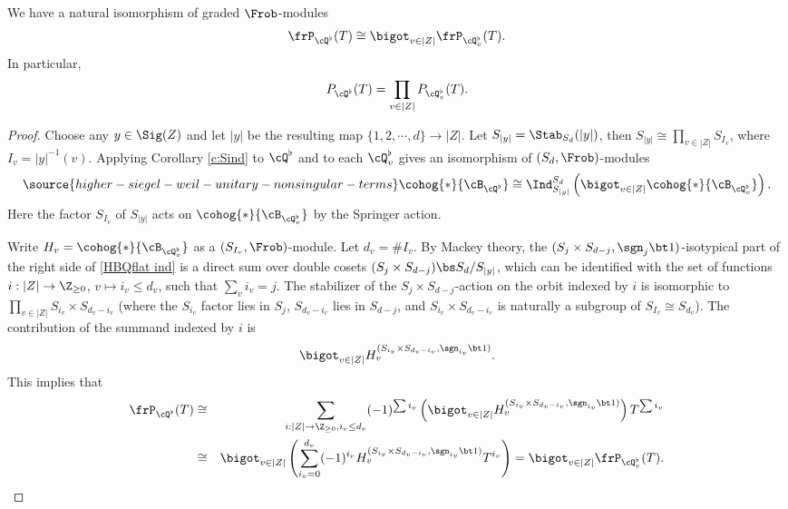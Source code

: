 \begin{lemma}
\notready\label{l:Spr factor}
We have a natural isomorphism of graded $\Frob$-modules
\begin{equation*}
\frP_{\cQ^{\flat}}(T)\cong\bigot_{v\in |Z|}\frP_{\cQ^{\flat}_{v}}(T).
\end{equation*}
In particular,
\begin{equation*}
P_{\cQ^{\flat}}(T)=\prod_{v\in |Z|}P_{\cQ^{\flat}_{v}}(T).
\end{equation*}
\end{lemma}
\begin{proof}
Choose any $y\in \Sig(Z)$ and let $|y|$ be the resulting map $\{1,2,\cdots, d\}\to |Z|$. Let $S_{|y|}=\Stab_{S_{d}}(|y|)$, then $S_{|y|}\cong \prod_{v\in|Z|}S_{I_{v}}$, where $I_{v}=|y|^{-1}(v)$. Applying  Corollary \ref{c:Sind} to $\cQ^{\flat}$ and to each $\cQ^{\flat}_{v}$ gives an isomorphism of $(S_{d},\Frob)$-modules
\begin{equation}\label{HBQflat ind}
\source{higher-siegel-weil-unitary-nonsingular-terms}
\cohog{*}{\cB_{\cQ^{\flat}}}\cong \Ind^{S_{d}}_{S_{|y|}}\left(\bigot_{v\in|Z|}\cohog{*}{\cB_{\cQ^{\flat}_{v}}}\right).
\end{equation}
Here the factor $S_{I_{v}}$ of $S_{|y|}$ acts on $\cohog{*}{\cB_{\cQ^{\flat}_{v}}}$ by the Springer action.

Write $H_{v}=\cohog{*}{\cB_{\cQ^{\flat}_{v}}}$ as a $(S_{I_{v}},\Frob)$-module. Let $d_{v}=\# I_{v}$. By Mackey theory, the $(S_{j}\times S_{d-j}, \sgn_{j}\bt1)$-isotypical part of the right side of \eqref{HBQflat ind} is a direct sum over double cosets $(S_{j}\times S_{d-j})\bs S_{d}/S_{|y|}$, which can be identified with the set of functions $i: |Z|\to \Z_{\ge0}$, $v\mapsto i_{v}\le d_{v}$, such that $\sum_{v}i_{v}=j$. The stabilizer of the $S_{j}\times S_{d-j}$-action on the orbit indexed by $i$ is isomorphic to $\prod_{v\in |Z|}S_{i_{v}}\times S_{d_{v}-i_{v}}$ (where the $S_{i_{v}}$ factor lies in $S_{j}$, $S_{d_{v}-i_{v}}$ lies in $S_{d-j}$, and $S_{i_{v}}\times S_{d_{v}-i_{v}}$ is naturally a subgroup of $S_{I_{v}}\cong S_{d_{v}}$). The contribution of the summand indexed by $i$ is
\begin{equation*}
\bigot_{v\in |Z|}H_{v}^{(S_{i_{v}}\times S_{d_{v}-i_{v}}, \sgn_{i_{v}}\bt 1)}.
\end{equation*}
This implies that
\begin{eqnarray*}
\frP_{\cQ^{\flat}}(T)&\cong &\sum_{i:|Z|\to \Z_{\ge0},  i_{v}\le d_{v}}(-1)^{\sum i_{v}}\left(\bigot_{v\in |Z|} H_{v}^{(S_{i_{v}}\times S_{d_{v}-i_{v}}, \sgn_{i_{v}}\bt 1)}\right)T^{\sum i_{v}}\\
&\cong&\bigot_{v\in |Z|}\left(\sum_{i_{v}=0}^{d_{v}} (-1)^{i_{v}}H_{v}^{(S_{i_{v}}\times S_{d_{v}-i_{v}}, \sgn_{i_{v}}\bt 1)}T^{i_{v}}\right) = \bigot_{v\in |Z|}\frP_{\cQ^{\flat}_{v}}(T).
\end{eqnarray*}
\end{proof}


